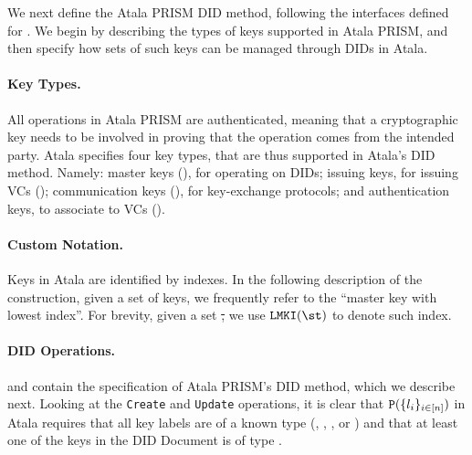 We next define the Atala PRISM DID method, following the interfaces defined for
\IdealFPKIDID. We begin by describing the types of keys supported in Atala
PRISM, and then specify how sets of such keys can be managed through DIDs in
Atala.

\paragraph{Key Types.} %
All operations in Atala PRISM are authenticated, meaning that a cryptographic
key needs to be involved in proving that the operation comes from the intended
party. Atala specifies four key types, that are thus supported in Atala's DID
method. Namely: master keys (\MasterKey), for operating on DIDs; issuing keys,
for issuing VCs (\IssueKey); communication keys (\CommKey), for key-exchange
protocols; and authentication keys, to associate to VCs (\AuthKey).

\paragraph{Custom Notation.} %
Keys in Atala are identified by indexes. In the following description of the
\RealPKIDIDAtala construction, given a set of keys, we frequently refer to the
``master key with lowest index''.  For brevity, given a set \st, we use
$\LMKI(\st)$ to denote such index.

\paragraph{DID Operations.} %
 and  contain the
specification of Atala PRISM's DID method,
which we describe next. Looking at the \texttt{Create} and \texttt{Update}
operations, it is clear that $\mathtt{P}(\lbrace l_i \rbrace_{i\in[n]})$ in Atala
requires that all key labels are of a known type (\MasterKey, \IssueKey,
\CommKey, or \AuthKey) and that at least one of the keys in the DID Document
is of type \MasterKey.

